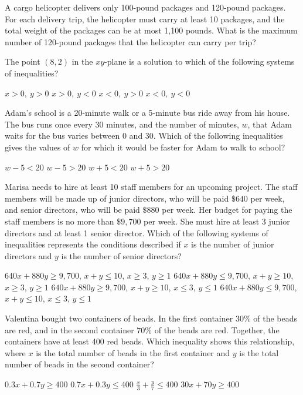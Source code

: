 \question[1]
A cargo helicopter delivers only 100-pound packages and 120-pound packages. For each delivery trip, the helicopter must carry at least 10 packages, and the total weight of the packages can be at most 1,100 pounds. What is the maximum number of 120-pound packages that the helicopter can carry per trip?
\begin{choices}
\end{choices}

\question[1]
The point $(8,2)$ in the $xy$-plane is a solution to which of the following systems of inequalities?
\begin{choices}
  \CorrectChoice $x > 0,\ y > 0$
  \choice $x > 0,\ y < 0$
  \choice $x < 0,\ y > 0$
  \choice $x < 0,\ y < 0$
\end{choices}



\question[1]
Adam's school is a 20-minute walk or a 5-minute bus ride away from his house. The bus runs once every 30 minutes, and the number of minutes, $w$, that Adam waits for the bus varies between 0 and 30. Which of the following inequalities gives the values of $w$ for which it would be faster for Adam to walk to school?
\begin{choices}
  \choice $w - 5 < 20$
  \choice $w - 5 > 20$
  \choice $w + 5 < 20$
  \CorrectChoice $w + 5 > 20$
\end{choices}

\newpage

\question[1]
Marisa needs to hire at least 10 staff members for an upcoming project. The staff members will be made up of junior directors, who will be paid $\$ 640$ per week, and senior directors, who will be paid $\$ 880$ per week. Her budget for paying the staff members is no more than $\$ 9,700$ per week. She must hire at least 3 junior directors and at least 1 senior director. Which of the following systems of inequalities represents the conditions described if $x$ is the number of junior directors and $y$ is the number of senior directors?
\begin{choices}
  \choice $640x + 880y \geq 9,\!700$, $x + y \leq 10$, $x \geq 3$, $y \geq 1$
  \CorrectChoice $640x + 880y \leq 9,\!700$, $x + y \geq 10$, $x \geq 3$, $y \geq 1$
  \choice $640x + 880y \geq 9,\!700$, $x + y \geq 10$, $x \leq 3$, $y \leq 1$
  \choice $640x + 880y \leq 9,\!700$, $x + y \leq 10$, $x \leq 3$, $y \leq 1$
\end{choices}


\question[1]
Valentina bought two containers of beads. In the first container 30\% of the beads are red, and in the second container $70 \%$ of the beads are red. Together, the containers have at least 400 red beads. Which inequality shows this relationship, where $x$ is the total number of beads in the first container and $y$ is the total number of beads in the second container?
\begin{choices}
  \CorrectChoice $0.3x + 0.7y \geq 400$
  \choice $0.7x + 0.3y \leq 400$
  \choice $\frac{x}{3} + \frac{y}{7} \leq 400$
  \choice $30x + 70y \geq 400$
\end{choices}



